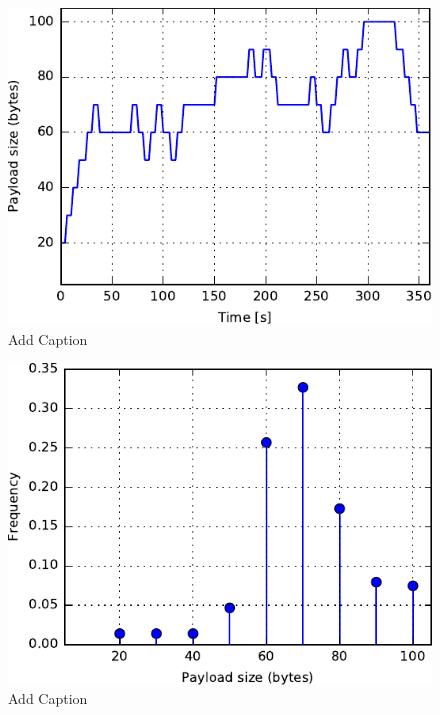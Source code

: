 \begin{figure}
\centering
\includegraphics[scale=1]{figs/45mDPLC.pdf} 
\caption{Add Caption}
\end{figure}
\begin{figure}
\centering
\includegraphics[scale=1]{figs/45mHist.pdf} 
\caption{Add Caption}
\end{figure}
